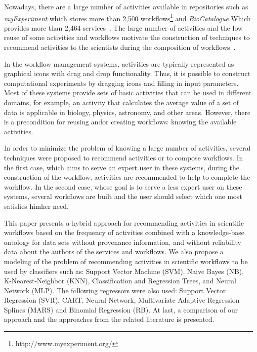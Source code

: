 \documentclass[40pt, a0, portrait]{a0poster}
\begin{document}
\begin{multicols}{2}
Nowadays, there are a large number of activities available in repositories such as \emph{myExperiment} which stores more than 2,500 workflows\footnote{http://www.myexperiment.org/} and \emph{BioCatalogue} Which provides more than 2,464 services~\cite{Biocatalogue}. The large number of activities and the low reuse of some activities and workflows motivate the construction of techniques to recommend activities to the scientists during the composition of workflows~\cite{Wang2010}.

In the workflow management systems, activities are typically represented as graphical icons with drag and drop functionality. Thus, it is possible to construct computational experiments by dragging icons and filling in input parameters. Most of these systems provide sets of basic activities that can be used in different domains, for example, an activity that calculates the average value of a set of data is applicable in biology, physics, astronomy, and other areas. However, there is a precondition for reusing and\/or creating workflows: knowing the available activities.

In order to minimize the problem of knowing a large number of activities, several techniques were proposed to recommend activities or to compose workflows. In the first case, which aims to serve an expert user in these systems, during the construction of the workflow, activities are recommended to help to complete the workflow. In the second case, whose goal is to serve a less expert user on these systems, several workflows are built and the user should select which one most satisfies him\/her need.

This paper presents a hybrid approach for recommending activities in scientific workflows based on the frequency of activities combined with a knowledge-base ontology for data sets without provenance information, and without reliability data about the authors of the services and workflows. We also propose a modeling of the problem of recommending activities in scientific workflows to be used by classifiers such as: Support Vector Machine (SVM), Naive Bayes (NB), K-Nearest-Neighbor (KNN), Classification and Regression Trees, and Neural Network (MLP). The following regressors were also used: Support Vector Regression (SVR), CART, Neural Network, Multivariate Adaptive Regression Splines (MARS) and Binomial Regression (RB). At last, a comparison of our approach and the approaches from the related literature is presented.



\end{multicols}
\end{document}
